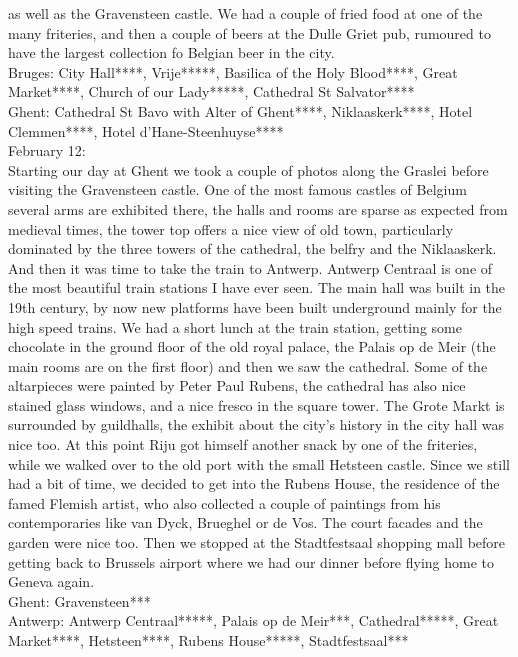 as well as the Gravensteen castle. We had a couple of fried food at one of the many friteries, and then a couple of beers at the Dulle Griet pub, rumoured to have the largest collection fo Belgian beer in the city.\\

Bruges: City Hall****, Vrije*****, Basilica of the Holy Blood****, Great Market****, Church of our Lady*****, Cathedral St Salvator****\\
Ghent: Cathedral St Bavo with Alter of Ghent****, Niklaaskerk****, Hotel Clemmen****, Hotel d'Hane-Steenhuyse****\\

February 12:\\
Starting our day at Ghent we took a couple of photos along the Graslei before visiting the Gravensteen castle. One of the most famous castles of Belgium several arms are exhibited there, the halls and rooms are sparse as expected from medieval times, the tower top offers a nice view of old town, particularly dominated by the three towers of the cathedral, the belfry and the Niklaaskerk. And then it was time to take the train to Antwerp. Antwerp Centraal is one of the most beautiful train stations I have ever seen. The main hall was built in the 19th century, by now new platforms have been built underground mainly for the high speed trains. We had a short lunch at the train station, getting some chocolate in the ground floor of the old royal palace, the Palais op de Meir (the main rooms are on the first floor) and then we saw the cathedral. Some of the altarpieces were painted by Peter Paul Rubens, the cathedral has also nice stained glass windows, and a nice fresco in the square tower. The Grote Markt is surrounded by guildhalls, the exhibit about the city's history in the city hall was nice too. At this point Riju got himself another snack by one of the friteries, while we walked over to the old port with the small Hetsteen castle. Since we still had a bit of time, we decided to get into the Rubens House, the residence of the famed Flemish artist, who also collected a couple of paintings from his contemporaries like van Dyck, Brueghel or de Vos. The court facades and the garden were nice too. Then we stopped at the Stadtfestsaal shopping mall before getting back to Brussels airport where we had our dinner before flying home to Geneva again.\\

Ghent: Gravensteen***\\
Antwerp: Antwerp Centraal*****, Palais op de Meir***, Cathedral*****, Great Market****, Hetsteen****, Rubens House*****, Stadtfestsaal***

